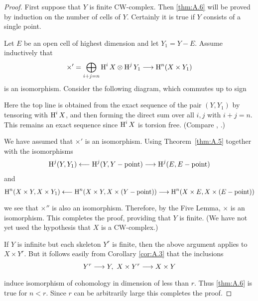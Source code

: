 \documentclass[../main]{subfiles}
\begin{document}
\begin{proof}
First suppose that $Y$ is finite CW-complex. Then \ref{thm:A.6} will be proved by induction on the number of cells of $Y$. Certainly it is true if $Y$ consists of a single point.

Let $E$ be an open cell of highest dimension and let $Y_1 = Y-E$. Assume inductively that \[\times' = \bigoplus_{i+j=n} \homology^i X \otimes \homology^j Y_1 \varrightarrow{} \homology^n (X \times Y_1)\] is an isomorphism. Consider the following diagram, which commutes up to sign

\begin{center}
\end{center}

Here the top line is obtained from the exact sequence of the pair $(Y, Y_1)$ by tensoring with $\operatorname{H}^i X$, and then forming the direct sum over all $i, j$ with $i+j=n$. This remains an exact sequence since $\operatorname{H}^i X$ is torsion free. (Compare \cite[p. 152]{maclane_1975}, \cite[p. 133]{cartan1956homological}.)

We have assumed that $\times'$ is an isomorphism. Using Theorem~\ref{thm:A.5} together with the isomorphisms \[\operatorname{H}^j (Y, Y_1 ) \longleftarrow  \operatorname{H}^j(Y, Y-\text{point}) \longrightarrow  \operatorname{H}^j (E, E-\text{point})\] and \[\homology^n(X\times Y, X\times Y_1) \longleftarrow  \homology^n (X\times Y, X\times (Y-\text{point})) \varrightarrow{} \homology^n (X\times E, X\times (E-\text{point}))\] we see that $\times''$ is also an isomorphism. Therefore, by the Five Lemma, $\times$ is an isomorphism. This completes the proof, providing that $Y$ is finite. (We have not yet used the hypothesis that $X$ is a CW-complex.)

If $Y$ is infinite but each skeleton $Y^r$ is finite, then the above argument applies to $X\times Y^r$. But it follows easily from Corollary \ref{cor:A.3} that the inclusions \[Y^r \varrightarrow{} Y,\,\, X\times Y^r \varrightarrow{} X \times Y\] induce isomorphism of cohomology in dimension of less than $r$. Thus \ref{thm:A.6} is true for $n<r$. Since $r$ can be arbitrarily large this completes the proof.
\end{proof}
\end{document}
